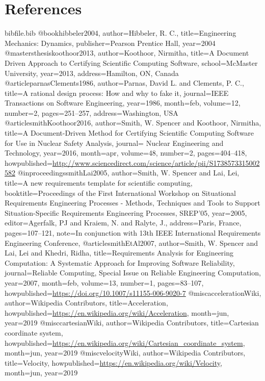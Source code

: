 \documentclass[12pt]{article}
\begin{document}
\section{References}
\label{Sec:References}
\begin{filecontents*}{bibfile.bib}
@book{hibbeler2004,
author={Hibbeler, R. C.},
title={Engineering Mechanics: Dynamics},
publisher={Pearson Prentice Hall},
year={2004}}
@mastersthesis{koothoor2013,
author={Koothoor, Nirmitha},
title={A Document Driven Approach to Certifying Scientific Computing Software},
school={McMaster University},
year={2013},
address={Hamilton, ON, Canada}}
@article{parnasClements1986,
author={Parnas, David L. and Clements, P. C.},
title={A rational design process: How and why to fake it},
journal={IEEE Transactions on Software Engineering},
year={1986},
month=feb,
volume={12},
number={2},
pages={251--257},
address={Washington, USA}}
@article{smithKoothoor2016,
author={Smith, W. Spencer and Koothoor, Nirmitha},
title={A Document-Driven Method for Certifying Scientific Computing Software for Use in Nuclear Safety Analysis},
journal={ Nuclear Engineering and Technology},
year={2016},
month=apr,
volume={48},
number={2},
pages={404--418},
howpublished={\url{http://www.sciencedirect.com/science/article/pii/S1738573315002582}}}
@inproceedings{smithLai2005,
author={Smith, W. Spencer and Lai, Lei},
title={A new requirements template for scientific computing},
booktitle={Proceedings of the First International Workshop on Situational Requirements Engineering Processes - Methods, Techniques and Tools to Support Situation-Specific Requirements Engineering Processes, SREP'05},
year={2005},
editor={Agerfalk, PJ and Kraiem, N. and Ralyte, J.},
address={Paris, France},
pages={107--121},
note={In conjunction with 13th IEEE International Requirements Engineering Conference,}}
@article{smithEtAl2007,
author={Smith, W. Spencer and Lai, Lei and Khedri, Ridha},
title={Requirements Analysis for Engineering Computation: A Systematic Approach for Improving Software Reliability},
journal={Reliable Computing, Special Issue on Reliable Engineering Computation},
year={2007},
month=feb,
volume={13},
number={1},
pages={83--107},
howpublished={\url{https://doi.org/10.1007/s11155-006-9020-7}}}
@misc{accelerationWiki,
author={Wikipedia Contributors},
title={Acceleration},
howpublished={\url{https://en.wikipedia.org/wiki/Acceleration}},
month=jun,
year={2019}}
@misc{cartesianWiki,
author={Wikipedia Contributors},
title={Cartesian coordinate system},
howpublished={\url{https://en.wikipedia.org/wiki/Cartesian\_coordinate\_system}},
month=jun,
year={2019}}
@misc{velocityWiki,
author={Wikipedia Contributors},
title={Velocity},
howpublished={\url{https://en.wikipedia.org/wiki/Velocity}},
month=jun,
year={2019}}
\end{filecontents*}
\nocite{*}
\printbibliography[heading=none]
\end{document}

